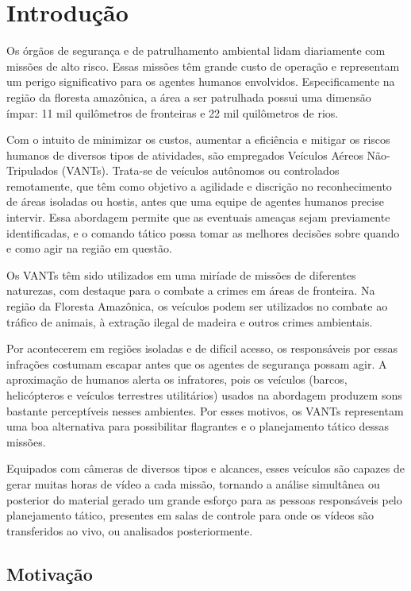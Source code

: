 \chapter{Introdução}

Os órgãos de segurança e de patrulhamento ambiental lidam diariamente com missões de alto risco. Essas missões têm grande custo de operação e representam um perigo significativo para os agentes humanos envolvidos. Especificamente na região da floresta amazônica, a área a ser patrulhada possui uma dimensão ímpar: 11 mil quilômetros de fronteiras e 22 mil quilômetros de rios.

Com o intuito de minimizar os custos, aumentar a eficiência e mitigar os riscos humanos de diversos tipos de atividades, são empregados Veículos Aéreos Não-Tripulados (VANTs). Trata-se de veículos autônomos ou controlados remotamente, que têm como objetivo a agilidade e discrição no reconhecimento de áreas isoladas ou hostis, antes que uma equipe de agentes humanos precise intervir. Essa abordagem permite que as eventuais ameaças sejam previamente identificadas, e o comando tático possa tomar as melhores decisões sobre quando e como agir na região em questão.

Os VANTs têm sido utilizados em uma miríade de missões de diferentes naturezas, com destaque para o combate a crimes em áreas de fronteira. Na região da Floresta Amazônica, os veículos podem ser utilizados no combate ao tráfico de animais, à extração ilegal de madeira e outros crimes ambientais.		

Por acontecerem em regiões isoladas e de difícil acesso, os responsáveis por essas infrações costumam escapar antes que os agentes de segurança possam agir. A aproximação de humanos alerta os infratores, pois os veículos (barcos, helicópteros e veículos terrestres utilitários) usados na abordagem produzem sons bastante perceptíveis nesses ambientes. Por esses motivos, os VANTs representam uma boa alternativa para possibilitar flagrantes e o planejamento tático dessas missões.

Equipados com câmeras de diversos tipos e alcances, esses veículos são capazes de gerar muitas horas de vídeo a cada missão, tornando a análise simultânea ou posterior do material gerado um grande esforço para as pessoas responsáveis pelo planejamento tático, presentes em salas de controle para onde os vídeos são transferidos ao vivo, ou analisados posteriormente.

\section{Motivação}

